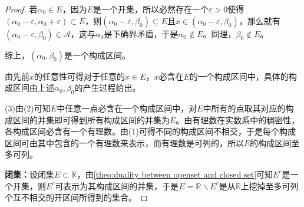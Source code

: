 \begin{proof}
	若$\alpha_0\in E$，因为$E$是一个开集，所以必然存在一个$\varepsilon>0$使得$(\alpha_0-\varepsilon,\alpha_0+\varepsilon)\subset E$，则$(\alpha_0-\varepsilon,\beta_0)\subseteq E$且$x\in(\alpha_0-\varepsilon,\beta_0)$，那么就有$(\alpha_0-\varepsilon,\beta_0)\in \mathscr{A}$，这与$\alpha_0$是下确界矛盾，于是$\alpha_0\notin E$。同理，$\beta_0\notin E$。\par
	综上，$(\alpha_0,\beta_0)$是一个构成区间。\par
	由先前$x$的任意性可得对于任意的$x\in E$，$x$必含在$E$的一个构成区间中，具体的构成区间由上述$\alpha_0,\beta_0$的产生过程给出。\par
	(3)由(2)可知$E$中任意一点必含在一个构成区间中，对$E$中所有的点取其对应的构成区间的并集即可得到所有构成区间的并集为$E$。由有理数在实数系中的稠密性，各构成区间必含有一个有理数。由(1)可得不同的构成区间不相交，于是每个构成区间可由其中包含的一个有理数来表示，而有理数是可列的，所以$E$的构成区间至多可列。\par
	\textbf{闭集：}设闭集$E\subset\mathbb{R}^{}$，由\cref{theo:duality between openset and closed set}可知$E^c$是一个开集，则$E^c$可表示为其构成区间的并集，于是$E=\mathbb{R}^{}\backslash E^c$是从$\mathbb{R}$上挖掉至多可列个互不相交的开区间所得到的集合。
\end{proof}

